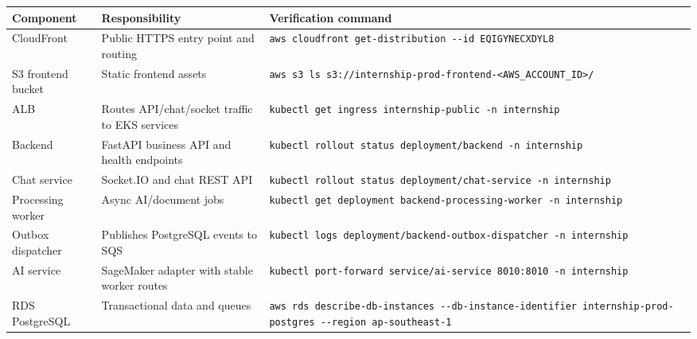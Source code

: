 {
\begingroup
\small
\setlength{\tabcolsep}{3pt}
\renewcommand{\arraystretch}{1.15}
\begin{longtable}{@{}
  >{\raggedright\arraybackslash}p{}
  >{\raggedright\arraybackslash}p{}
  >{\raggedright\arraybackslash}p{}@{}}
\toprule\noalign{}
\begin{minipage}[b]{\linewidth}\raggedright
Component
\end{minipage} & \begin{minipage}[b]{\linewidth}\raggedright
Responsibility
\end{minipage} & \begin{minipage}[b]{\linewidth}\raggedright
Verification command
\end{minipage} \\
\midrule\noalign{}
\endhead
\bottomrule\noalign{}
\endlastfoot
CloudFront & Public HTTPS entry point and routing &
\texttt{aws\ cloudfront\ get-\allowbreak{}distribution\ -\/\allowbreak{}-id\ EQIGYNECXDYL8} \\
S3 frontend bucket & Static frontend assets &
\texttt{aws\ s3\ ls\ s3://internship-prod-frontend-\textless{}AWS\_ACCOUNT\_ID\textgreater{}/} \\
ALB & Routes API/chat/socket traffic to EKS services &
\texttt{kubectl\ get\ ingress\ internship-\allowbreak{}public\ -n\ internship} \\
Backend & FastAPI business API and health endpoints &
\texttt{kubectl\ rollout\ status\ deployment/\allowbreak{}backend\ -n\ internship} \\
Chat service & Socket.IO and chat REST API &
\texttt{kubectl\ rollout\ status\ deployment/\allowbreak{}chat-\allowbreak{}service\ -n\ internship} \\
Processing worker & Async AI/document jobs &
\texttt{kubectl\ get\ deployment\ backend-\allowbreak{}processing-\allowbreak{}worker\ -n\ internship} \\
Outbox dispatcher & Publishes PostgreSQL events to SQS &
\texttt{kubectl\ logs\ deployment/\allowbreak{}backend-\allowbreak{}outbox-\allowbreak{}dispatcher\ -n\ internship} \\
AI service & SageMaker adapter with stable worker routes &
\texttt{kubectl\ port-\allowbreak{}forward\ service/\allowbreak{}ai-\allowbreak{}service\ 8010:8010\ -n\ internship} \\
RDS PostgreSQL & Transactional data and queues &
\texttt{aws\ rds\ describe-\allowbreak{}db-\allowbreak{}instances\ -\/\allowbreak{}-db-\allowbreak{}instance-\allowbreak{}identifier\ internship-\allowbreak{}prod-\allowbreak{}postgres\ -\/\allowbreak{}-region\ ap-\allowbreak{}southeast-\allowbreak{}1} \\

\end{longtable}}
